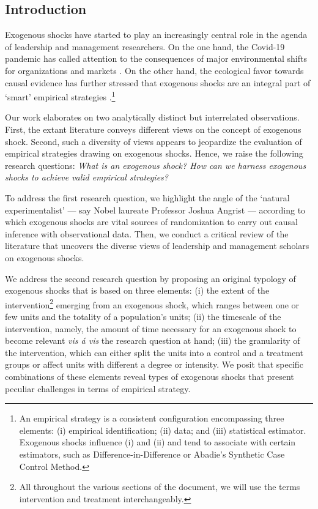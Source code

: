 \documentclass[11pt]{article}
\begin{document}
\begin{refsection}

\section{Introduction}
\label{sec:introduction}

\noindent Exogenous shocks have started to play an increasingly central role in
the agenda of leadership and management researchers. On the one hand, the
Covid-19 pandemic has called attention to the consequences of major
environmental shifts for organizations \autocite{kniffin_et_al_2021} and markets
\autocite{zhang_et_al_2020}.  On the other hand, the ecological favor towards
causal evidence has further stressed that exogenous shocks are an integral part
of `smart' empirical strategies \autocite{angrist_2022}.\footnote{An empirical
strategy is a consistent configuration encompassing three elements: (i)
empirical identification; (ii) data; and (iii) statistical estimator. Exogenous
shocks influence (i) and (ii) and tend to associate with certain estimators,
such as Difference-in-Difference or Abadie's Synthetic Case Control Method.}

Our work elaborates on two analytically distinct but interrelated observations. 
First, the extant literature conveys different views on the concept of exogenous
shock. Second, such a diversity of views appears to jeopardize the evaluation of
empirical strategies drawing on exogenous shocks.  Hence, we raise the following
research questions: \textit{What is an exogenous shock? How can we harness
exogenous shocks to achieve valid empirical strategies?}  

To address the first research question, we highlight the angle of the
`natural experimentalist' --- say Nobel laureate Professor Joshua Angrist --- 
according to which exogenous shocks are vital sources of randomization to carry
out causal inference with observational data.  Then, we conduct a critical
review of the literature that uncovers the diverse views of leadership and
management scholars on exogenous shocks. 

We address the second research question by proposing an original typology of
exogenous shocks that is based on three elements: (i) the extent of the
intervention\footnote{All throughout the various sections of the document,
we will use the terms intervention and treatment interchangeably.} emerging  
from an exogenous shock, which ranges between one or few units and the totality 
of a population's units; (ii) the timescale of the intervention, namely, 
the amount of time necessary for an exogenous shock to become relevant 
\textit{vis \'a vis} the research question at hand; (iii) the granularity 
of the intervention, which can either split the units into a control and a 
treatment groups or affect units with different a degree or intensity. 
We posit that specific combinations of these elements reveal types 
of exogenous shocks that present peculiar challenges in terms of 
empirical strategy.


\end{refsection}
\end{document}
